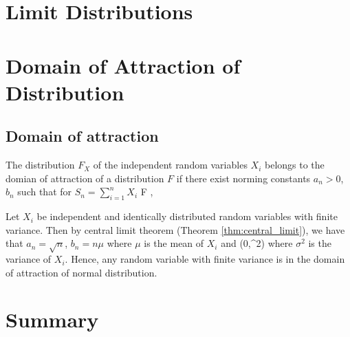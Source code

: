 \section{Limit Distributions}

\section{Domain of Attraction of Distribution}

\subsection{Domain of attraction}

\begin{definition}
The distribution $F_X$ of the independent random variables $X_i$ belongs to the domian of attraction of a distribution $F$ if there exist norming constants $a_n>0$, $b_n$ such that for $S_n  = \sum^n_{i=1}X_i$ %
\be
{}  F ,\qquad {}
\ee
\end{definition}

\begin{example}%
Let $X_i$ be independent and identically distributed random variables with finite variance. Then by central limit theorem (Theorem \ref{thm:central_limit}), we have that $a_n = \sqrt{n}$, $b_n = n\mu$ where $\mu$ is the mean of $X_i$ and
\be
{}  \sN(0,\sigma^2)
\ee
where $\sigma^2$ is the variance of $X_i$. Hence, any random variable with finite variance is in the domain of attraction of normal distribution.
\end{example}

\section{Summary}

